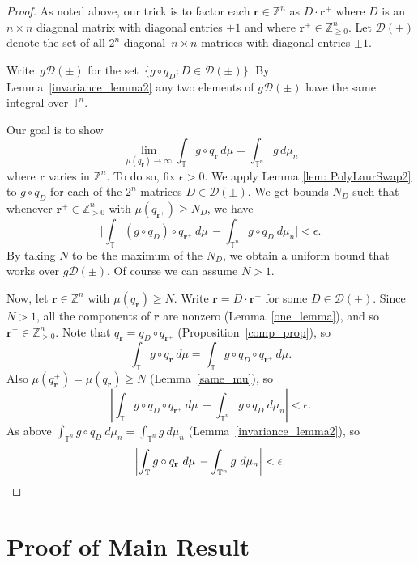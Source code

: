 \documentclass[12pt]{amsart}
\theoremstyle{plain}
\theoremstyle{definition}
\theoremstyle{remark}
\numberwithin{theorem}{section}
\numberwithin{equation}{section} %
\newcommand{\ZZ}{\mathbb{Z}}
\def \bfr{{\mathbf r}}
\newcommand{\bZ}{{\mathbb{Z}}}
\newcommand{\mb}{\mathbf}
\newcommand{\torus}{{\mathbb{T}}}
\begin{document}
\begin{proof}
    As noted above, our trick is to  factor each $\bfr\in \ZZ^n$ as $D\cdot \bfr^+$ where $D$ is an $n\times n$ diagonal matrix with diagonal entries $\pm 1$ and where $\bfr^+\in\ZZ^n_{\ge 0}$. 
    Let $\mathcal{D}(\pm)$ denote the set of all $2^n$ diagonal~$n\times n$ matrices with diagonal entries $\pm 1$.
    
    Write~$g\mathcal{D}(\pm)$ for the set~$\{g\circ q_D: D\in \mathcal{D}(\pm)\}$.
    By Lemma~\ref{invariance_lemma2} any two elements of $g\mathcal{D}(\pm)$ have the same integral over $\torus^n$. 
    

    Our goal is to show
    $$\lim_{\mu \left( q_{\mb r} \right)  \to \infty} \int_{\torus}  g \circ q_\bfr \, d\mu = \int_{\torus^n} g \, d\mu_n$$ 
    where $\bfr$ varies in $\ZZ^n$. 
To do so, fix $\epsilon>0$.  
We apply Lemma \ref{lem: PolyLaurSwap2} to  $g \circ q_D$ for each of the $2^n$ matrices $D \in \mathcal{D}(\pm)$. 
We get bounds $N_D$ such that whenever $\bfr^+\in\ZZ^n_{>0}$ with $\mu\left(q_{\bfr^+} \right)\geq N_D$, we have
    \[
    \Bigg|
    \int_{\torus} (g\circ q_D) \circ q_{\bfr^+} \ d\mu \, - \int_{\torus^n} g\circ q_D \ d \mu_n \Bigg|<\epsilon.
    \]
   By taking $N$ to be the maximum of the $N_D$, we obtain a uniform bound that works over $g\mathcal{D}(\pm)$.
   Of course we can assume $N > 1$.

    Now, let $\bfr\in\ZZ^n$ with $\mu\left( q_{\mb r} \right) \geq N$. Write $\bfr=D\cdot \bfr^+$ for some $D\in \mathcal{D}(\pm)$. 
    Since $N > 1$, all the components of $\mb r$ are nonzero (Lemma~\ref{one_lemma}), and so $\mb r^+ \in \bZ^n_{>0}$.
Note that $q_{\mb r} = q_D \circ q_{\mb r^+}$ (Proposition~\ref{comp_prop}), so 
     \[
     \int_{\torus} g\circ q_\bfr \ d\mu= \int_{\torus} g\circ q_D \circ q_{\bfr^+} \ d\mu.
     \]
Also $\mu\left( q_{\mb r}^+ \right) = \mu\left( q_{\mb r} \right) \ge N$ (Lemma~\ref{same_mu}), so
    \[
    \left|
    \int_{\torus} g\circ q_D \circ q_{\bfr^+} \ d\mu \, - \int_{\torus^n} g\circ q_D \ d \mu_n 
    \right|<\epsilon.
    \]
    As above $\int_{\torus^n} g\circ q_D \ d\mu_n=\int_{\torus^n} g \  d\mu_n$ (Lemma~\ref{invariance_lemma2}), so
    \[ \left|
           \int_{\torus} g\circ q_\bfr  \ d\mu  \, -   \int_{\torus^n} g  \ d \mu_n 
           \right|<\epsilon. \qedhere
     \]
\end{proof}



\section{Proof of Main Result}
\end{document}
